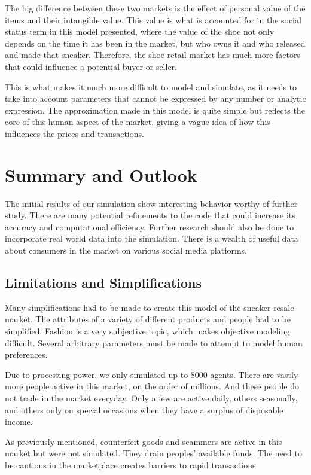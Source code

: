 \documentclass[12pt]{article}
\begin{document}
The big difference between these two markets is the effect of personal value of the items and their intangible value. This value is what is accounted for in the social status term in this model presented, where the value of the shoe not only depends on the time it has been in the market, but who owns it and who released and made that sneaker. Therefore, the shoe retail market has much more factors that could influence a potential buyer or seller.

This is what makes it much more difficult to model and simulate, as it needs to take into account parameters that cannot be expressed by any number or analytic expression. The approximation made in this model is quite simple but reflects the core of this human aspect of the market, giving a vague idea of how this influences the prices and transactions.

\newpage
\section{Summary and Outlook}

The initial results of our simulation show interesting behavior worthy of further study. There are many potential refinements to the code that could increase its accuracy and computational efficiency.  Further research should also be done to incorporate real world data into the simulation. There is a wealth of useful data about consumers in the market on various social media platforms. 

\subsection{Limitations and Simplifications}

Many simplifications had to be made to create this model of the sneaker resale market. The attributes of a variety of different products and people had to be simplified. Fashion is a very subjective topic, which makes objective modeling difficult. Several arbitrary parameters must be made to attempt to model human preferences. 

Due to processing power, we only simulated up to 8000 agents. There are vastly more people active in this market, on the order of millions. And these people do not trade in the market everyday. Only a few are active daily, others seasonally, and others only on special occasions when they have a surplus of disposable income. 

As previously mentioned, counterfeit goods and scammers are active in this market but were not simulated. They drain peoples' available funds. The need to be cautious in the marketplace creates barriers to rapid transactions.
\end{document}
